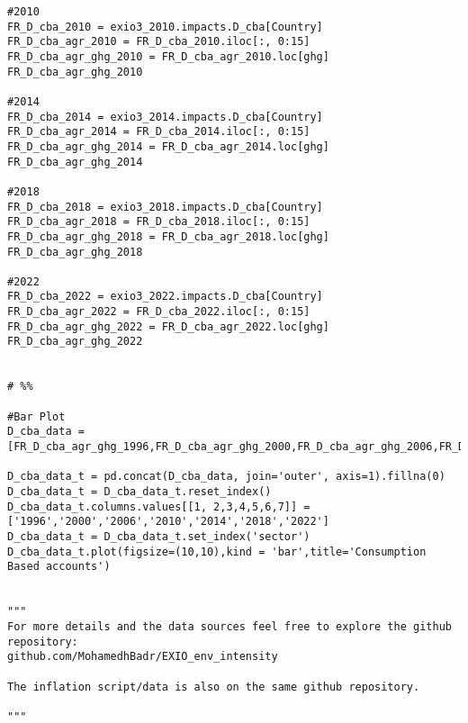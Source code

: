 \documentclass[a4paper,twoside]{article}
\begin{document}
\begin{verbatim}
#2010
FR_D_cba_2010 = exio3_2010.impacts.D_cba[Country]
FR_D_cba_agr_2010 = FR_D_cba_2010.iloc[:, 0:15]
FR_D_cba_agr_ghg_2010 = FR_D_cba_agr_2010.loc[ghg]
FR_D_cba_agr_ghg_2010

#2014
FR_D_cba_2014 = exio3_2014.impacts.D_cba[Country]
FR_D_cba_agr_2014 = FR_D_cba_2014.iloc[:, 0:15]
FR_D_cba_agr_ghg_2014 = FR_D_cba_agr_2014.loc[ghg]
FR_D_cba_agr_ghg_2014

#2018
FR_D_cba_2018 = exio3_2018.impacts.D_cba[Country]
FR_D_cba_agr_2018 = FR_D_cba_2018.iloc[:, 0:15]
FR_D_cba_agr_ghg_2018 = FR_D_cba_agr_2018.loc[ghg]
FR_D_cba_agr_ghg_2018

#2022
FR_D_cba_2022 = exio3_2022.impacts.D_cba[Country]
FR_D_cba_agr_2022 = FR_D_cba_2022.iloc[:, 0:15]
FR_D_cba_agr_ghg_2022 = FR_D_cba_agr_2022.loc[ghg]
FR_D_cba_agr_ghg_2022


# %%

#Bar Plot
D_cba_data = [FR_D_cba_agr_ghg_1996,FR_D_cba_agr_ghg_2000,FR_D_cba_agr_ghg_2006,FR_D_cba_agr_ghg_2010,FR_D_cba_agr_ghg_2014,FR_D_cba_agr_ghg_2018,FR_D_cba_agr_ghg_2022]

D_cba_data_t = pd.concat(D_cba_data, join='outer', axis=1).fillna(0)
D_cba_data_t = D_cba_data_t.reset_index()
D_cba_data_t.columns.values[[1, 2,3,4,5,6,7]] = ['1996','2000','2006','2010','2014','2018','2022']
D_cba_data_t = D_cba_data_t.set_index('sector')
D_cba_data_t.plot(figsize=(10,10),kind = 'bar',title='Consumption Based accounts')


"""
For more details and the data sources feel free to explore the github repository:
github.com/MohamedhBadr/EXIO_env_intensity 

The inflation script/data is also on the same github repository. 

"""
\end{verbatim}
\end{document}
